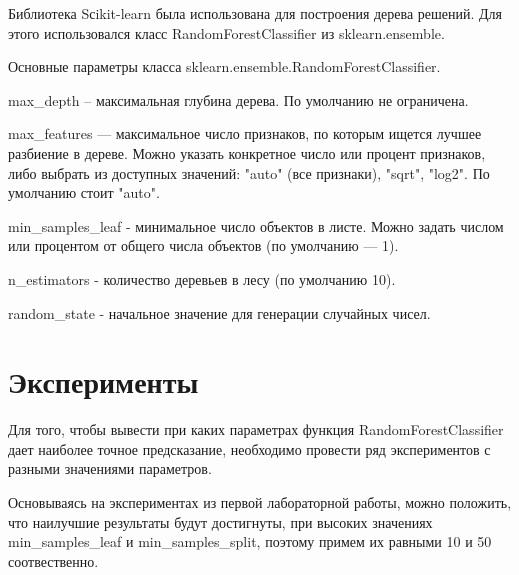 \documentclass[a4paper,12pt]{article}
\begin{document}
	\vspace{0.5cm}
	Библиотека Sсikit-learn была использована для построения дерева решений. Для этого использовался класс RandomForestClassifier из sklearn.ensemble. 
	
	\vspace{0.5cm}
	Основные параметры класса sklearn.ensemble.RandomForestClassifier.
	
	\vspace{0.5cm}
	max\_depth – максимальная глубина дерева. По умолчанию не ограничена.
	
	\vspace{0.5cm}
	max\_features — максимальное число признаков, по которым ищется лучшее разбиение в дереве. Можно указать конкретное число или процент признаков, либо выбрать из доступных значений: "auto" (все признаки), "sqrt", "log2". По умолчанию стоит "auto".
	
	\vspace{0.5cm}
	min\_samples\_leaf - минимальное число объектов в листе. Можно задать числом или процентом от общего числа объектов (по умолчанию — 1).
	
	\vspace{0.5cm}
	n\_estimators - количество деревьев в лесу (по умолчанию 10).
	
	\vspace{0.5cm}
	random\_state - начальное значение для генерации случайных чисел.

	
\newpage\section{Эксперименты}
	Для того, чтобы вывести при каких параметрах функция RandomForestClassifier дает наиболее точное предсказание, необходимо провести ряд экспериментов с разными значениями параметров. 
	
	\vspace{0.5cm}
	Основываясь на экспериментах из первой лабораторной работы, можно положить, что наилучшие результаты будут достигнуты, при высоких значениях min\_samples\_leaf и min\_samples\_split, поэтому примем их равными 10 и 50 соотвественно.
\end{document}
